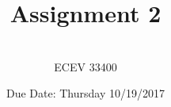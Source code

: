 \documentclass{article}
\begin{document}

\title{Assignment 2} %
\author{ \\ECEV 33400} %
\date{Due Date: Thursday 10/19/2017} %

\maketitle

%
%
\end{document}
